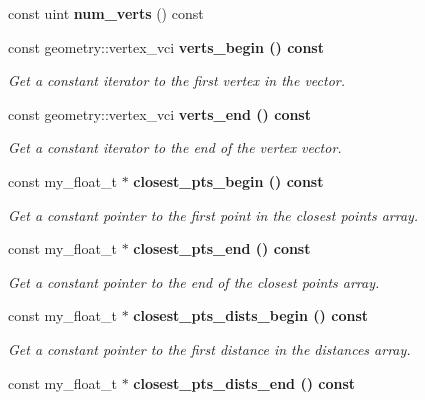 \begin{CompactItemize}
\item 
const uint \textbf{num\_\-verts} () const \label{classSimSite3D_1_1model__hbond__surf__t_7a0344de6eb971227cf37c96b0b11606}

\item 
const geometry::vertex\_\-vci \bf{verts\_\-begin} () const \label{classSimSite3D_1_1model__hbond__surf__t_fad5a5374d17a84192f1f8fc74ea8876}

\begin{CompactList}\small\item\em Get a constant iterator to the first vertex in the vector. \item\end{CompactList}\item 
const geometry::vertex\_\-vci \bf{verts\_\-end} () const \label{classSimSite3D_1_1model__hbond__surf__t_50ec409886843895685f8549707ba15e}

\begin{CompactList}\small\item\em Get a constant iterator to the end of the vertex vector. \item\end{CompactList}\item 
const my\_\-float\_\-t $\ast$ \bf{closest\_\-pts\_\-begin} () const \label{classSimSite3D_1_1model__hbond__surf__t_d97fb2ca02976980a4c1e78b46b0df63}

\begin{CompactList}\small\item\em Get a constant pointer to the first point in the closest points array. \item\end{CompactList}\item 
const my\_\-float\_\-t $\ast$ \bf{closest\_\-pts\_\-end} () const \label{classSimSite3D_1_1model__hbond__surf__t_dd599b65e329040ffdaea701a3acbaeb}

\begin{CompactList}\small\item\em Get a constant pointer to the end of the closest points array. \item\end{CompactList}\item 
const my\_\-float\_\-t $\ast$ \bf{closest\_\-pts\_\-dists\_\-begin} () const \label{classSimSite3D_1_1model__hbond__surf__t_05e5c2efb6bd80474c20a983c10324ff}

\begin{CompactList}\small\item\em Get a constant pointer to the first distance in the distances array. \item\end{CompactList}\item 
const my\_\-float\_\-t $\ast$ \bf{closest\_\-pts\_\-dists\_\-end} () const \label{classSimSite3D_1_1model__hbond__surf__t_a0183e08be99f865caa5c59f0441529f}


\end{CompactItemize}
